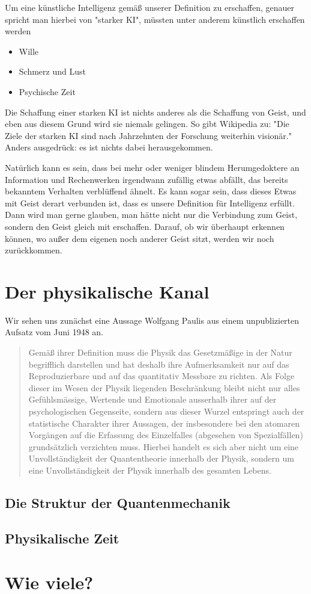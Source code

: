 \documentclass[12pt]{book}
\begin{document}
Um eine künstliche Intelligenz gemäß unserer Definition zu erschaffen, genauer spricht man hierbei von "starker KI", müssten unter anderem künstlich erschaffen werden

\begin{itemize}
\item Wille
\item Schmerz und Lust
\item Psychische Zeit
\end{itemize}

Die Schaffung einer starken KI ist nichts anderes als die Schaffung von Geist, und eben aus diesem Grund wird sie niemals gelingen. So gibt Wikipedia zu:
"Die Ziele der starken KI sind nach Jahrzehnten der Forschung weiterhin visionär." Anders ausgedrück: es ist nichts dabei herausgekommen.

Natürlich kann es sein, dass bei mehr oder weniger blindem Herumgedoktere an Information und Rechenwerken irgendwann zufällig etwas abfällt, das bereits bekanntem Verhalten verblüffend ähnelt. Es kann sogar sein, dass dieses Etwas mit Geist derart verbunden ist, dass es unsere Definition für Intelligenz erfüllt. Dann wird man gerne glauben, man hätte nicht nur die Verbindung zum Geist, sondern den Geist gleich mit erschaffen. Darauf, ob wir überhaupt erkennen können, wo außer dem eigenen noch anderer Geist sitzt, werden wir noch zurückkommen.


\chapter{Der physikalische Kanal}
Wir sehen uns zunächst eine Aussage Wolfgang Paulis aus einem unpublizierten Aufsatz vom Juni 1948 an.
\begin{quote}\begin{tcolorbox}
Gemäß ihrer Definition muss die Physik das Gesetzmäßige in der Natur begrifflich darstellen und hat deshalb ihre Aufmerksamkeit nur auf das Reproduzierbare und auf das quantitativ Messbare zu richten. Als Folge dieser im Wesen der Physik liegenden Beschränkung bleibt nicht nur alles Gefühlsmässige, Wertende und Emotionale ausserhalb ihrer auf der psychologischen Gegenseite, sondern aus dieser Wurzel entspringt auch der statistische Charakter ihrer Aussagen, der insbesondere bei den atomaren Vorgängen auf die Erfassung des Einzelfalles (abgesehen von Spezialfällen) grundsätzlich verzichten muss. Hierbei handelt es sich aber nicht um eine Unvollständigkeit der Quantentheorie innerhalb der Physik, sondern um eine Unvollständigkeit der Physik innerhalb des gesamten Lebens.
\end{tcolorbox}\end{quote}

\section{Die Struktur der Quantenmechanik}

\section{Physikalische Zeit}

\chapter{Wie viele?}
\end{document}
